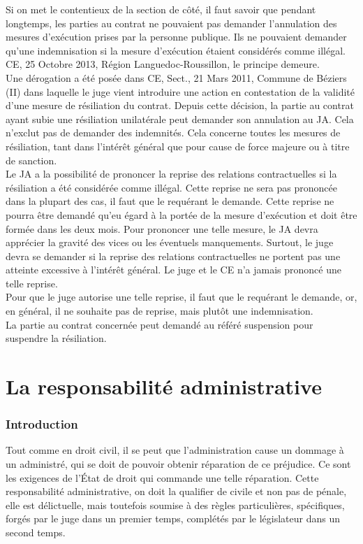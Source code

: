 \documentclass[10pt, a4paper, openany]{book}
\begin{document}
Si on met le contentieux de la section de côté, il faut savoir que pendant longtemps, les parties au contrat ne pouvaient pas demander l'annulation des mesures d'exécution prises par la personne publique. Ils ne pouvaient demander qu'une indemnisation si la mesure d'exécution étaient considérés comme illégal. CE, 25 Octobre 2013, Région Languedoc-Roussillon, le principe demeure. \\
Une dérogation a été posée dans CE, Sect., 21 Mars 2011, Commune de Béziers (II) dans laquelle le juge vient introduire une action en contestation de la validité d'une mesure de résiliation du contrat. Depuis cette décision, la partie au contrat ayant subie une résiliation unilatérale peut demander son annulation au JA. Cela n'exclut pas de demander des indemnités. Cela concerne toutes les mesures de résiliation, tant dans l'intérêt général que pour cause de force majeure ou à titre de sanction. \\
Le JA a la possibilité de prononcer la reprise des relations contractuelles si la résiliation a été considérée comme illégal. Cette reprise ne sera pas prononcée dans la plupart des cas, il faut que le requérant le demande. Cette reprise ne pourra être demandé qu'eu égard à la portée de la mesure d'exécution et doit être formée dans les deux mois. Pour prononcer une telle mesure, le JA devra apprécier la gravité des vices ou les éventuels manquements. Surtout, le juge devra se demander si la reprise des relations contractuelles ne portent pas une atteinte excessive à l'intérêt général. Le juge et le CE n'a jamais prononcé une telle reprise. \\
Pour que le juge autorise une telle reprise, il faut que le requérant le demande, or, en général, il ne souhaite pas de reprise, mais plutôt une indemnisation. \\
La partie au contrat concernée peut demandé au référé suspension pour suspendre la résiliation.

\part{La responsabilité administrative}

\section{Introduction}

Tout comme en droit civil, il se peut que l'administration cause un dommage à un administré, qui se doit de pouvoir obtenir réparation de ce préjudice. Ce sont les exigences de l'État de droit qui commande une telle réparation. Cette responsabilité administrative, on doit la qualifier de civile et non pas de pénale, elle est délictuelle, mais toutefois soumise à des règles particulières, spécifiques, forgés par le juge dans un premier temps, complétés par le législateur dans un second temps. 
\end{document}
